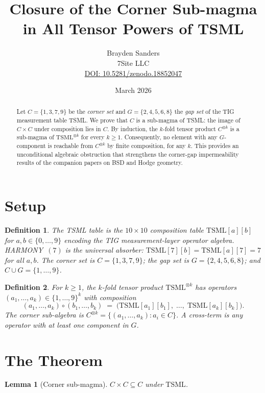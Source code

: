 \documentclass[11pt]{article}
\title{Closure of the Corner Sub-magma\\
in All Tensor Powers of TSML}
\author{Brayden Sanders\\7Site LLC\\
\small\href{https://doi.org/10.5281/zenodo.18852047}%
{DOI: 10.5281/zenodo.18852047}}
\date{March 2026}
\newtheorem{lemma}{Lemma}
\newtheorem{definition}{Definition}
\begin{document}
\maketitle

\begin{abstract}
Let $C=\{1,3,7,9\}$ be the \emph{corner set} and $G=\{2,4,5,6,8\}$ the
\emph{gap set} of the TIG measurement table TSML\@.
We prove that $C$ is a sub-magma of TSML\@: the image of $C\times C$
under composition lies in $C$.
By induction, the $k$-fold tensor product $C^{\otimes k}$ is a
sub-magma of $\mathrm{TSML}^{\otimes k}$ for every $k\ge1$.
Consequently, no element with any $G$-component is reachable from
$C^{\otimes k}$ by finite composition, for any $k$.
This provides an unconditional algebraic obstruction that
strengthens the corner-gap impermeability results of the companion
papers on BSD and Hodge geometry.
\end{abstract}

\section{Setup}

\begin{definition}
The \emph{TSML table} is the $10\times10$ composition table
$\mathrm{TSML}[a][b]$ for $a,b\in\{0,\ldots,9\}$ encoding the TIG
measurement-layer operator algebra.
HARMONY~$(7)$ is the universal absorber:
$\mathrm{TSML}[7][b]=\mathrm{TSML}[a][7]=7$ for all $a,b$.
The \emph{corner set} is $C=\{1,3,7,9\}$; the \emph{gap set} is
$G=\{2,4,5,6,8\}$; and $C\cup G=\{1,\ldots,9\}$.
\end{definition}

\begin{definition}
For $k\ge1$, the \emph{$k$-fold tensor product} $\mathrm{TSML}^{\otimes k}$
has operators $(a_1,\ldots,a_k)\in\{1,\ldots,9\}^k$ with composition
\[
(a_1,\ldots,a_k)\circ(b_1,\ldots,b_k)
\;=\;
\bigl(\mathrm{TSML}[a_1][b_1],\;\ldots,\;\mathrm{TSML}[a_k][b_k]\bigr).
\]
The \emph{corner sub-algebra} is $C^{\otimes k}=\{(a_1,\ldots,a_k):a_i\in C\}$.
A \emph{cross-term} is any operator with at least one component in $G$.
\end{definition}

\section{The Theorem}

\begin{lemma}[Corner sub-magma]\label{lem:submagma}
$C\times C\subseteq C$ under $\mathrm{TSML}$.
\end{lemma}
\end{document}
